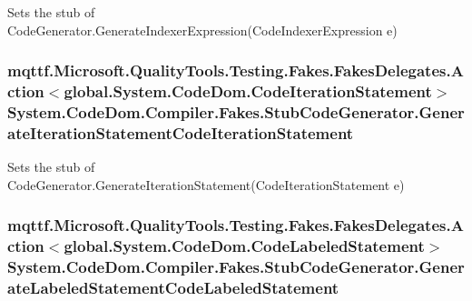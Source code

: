 Sets the stub of Code\-Generator.\-Generate\-Indexer\-Expression(\-Code\-Indexer\-Expression e)

\hypertarget{class_system_1_1_code_dom_1_1_compiler_1_1_fakes_1_1_stub_code_generator_a0bcd2fe4945af80bc36d91ebf6df3452}{
\subsubsection[{Generate\-Iteration\-Statement\-Code\-Iteration\-Statement}]{\setlength{\rightskip}{0pt plus 5cm}mqttf.\-Microsoft.\-Quality\-Tools.\-Testing.\-Fakes.\-Fakes\-Delegates.\-Action$<$global.\-System.\-Code\-Dom.\-Code\-Iteration\-Statement$>$ System.\-Code\-Dom.\-Compiler.\-Fakes.\-Stub\-Code\-Generator.\-Generate\-Iteration\-Statement\-Code\-Iteration\-Statement}}\label{class_system_1_1_code_dom_1_1_compiler_1_1_fakes_1_1_stub_code_generator_a0bcd2fe4945af80bc36d91ebf6df3452}


Sets the stub of Code\-Generator.\-Generate\-Iteration\-Statement(\-Code\-Iteration\-Statement e)

\hypertarget{class_system_1_1_code_dom_1_1_compiler_1_1_fakes_1_1_stub_code_generator_a8ae72ca462bebf551b43b7b838a266e2}{
\subsubsection[{Generate\-Labeled\-Statement\-Code\-Labeled\-Statement}]{\setlength{\rightskip}{0pt plus 5cm}mqttf.\-Microsoft.\-Quality\-Tools.\-Testing.\-Fakes.\-Fakes\-Delegates.\-Action$<$global.\-System.\-Code\-Dom.\-Code\-Labeled\-Statement$>$ System.\-Code\-Dom.\-Compiler.\-Fakes.\-Stub\-Code\-Generator.\-Generate\-Labeled\-Statement\-Code\-Labeled\-Statement}}\label{class_system_1_1_code_dom_1_1_compiler_1_1_fakes_1_1_stub_code_generator_a8ae72ca462bebf551b43b7b838a266e2}


